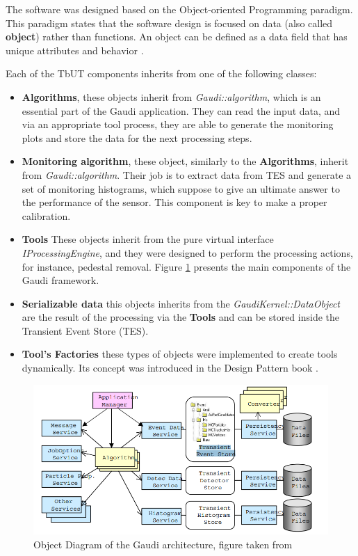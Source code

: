 The software was designed based on the Object-oriented Programming paradigm.   This paradigm states that the software design is focused on data (also called \textbf{object}) rather than functions. An object can be defined as a data field that has unique attributes and behavior \cite{programming_paradigma}. 

Each of the TbUT components inherits from one of the following classes:  

\begin{itemize}
    \item \textbf{Algorithms}, these objects inherit from \textit{Gaudi::algorithm}, which is an essential part of the Gaudi application. They can read the input data, and via an appropriate tool process, they are able to generate the monitoring plots and store the data for the next processing steps. 
    \item \textbf{Monitoring algorithm}, these object, similarly to the \textbf{Algorithms}, inherit from  \textit{Gaudi::algorithm}. Their job is to extract data from TES and generate a set of monitoring histograms, which suppose to give an ultimate answer to the performance of the sensor. This component is key to make a  proper calibration. 
    \item \textbf{Tools} These objects inherit from the pure virtual interface \textit{IProcessingEngine}, and they were designed to perform the processing actions, for instance, pedestal removal. Figure \ref{fig:gaudi flow} presents the main components of the Gaudi framework.   
    \item \textbf{Serializable data} this objects inherits from the \textit{GaudiKernel::DataObject} are the result of the processing via the \textbf{Tools} and can be stored inside the Transient Event Store (TES). 
    \item \textbf{ Tool's Factories} these types of objects were implemented to create tools dynamically. Its concept was introduced in the Design Pattern book \cite{DesignPatterns}. 
\end{itemize}

\begin{figure}[h]
\centering
\includegraphics{figures/Gaudi.png}
\caption{Object Diagram of the Gaudi architecture, figure taken from \cite{Gaudi}}
\label{fig:gaudi flow}
\end{figure}


